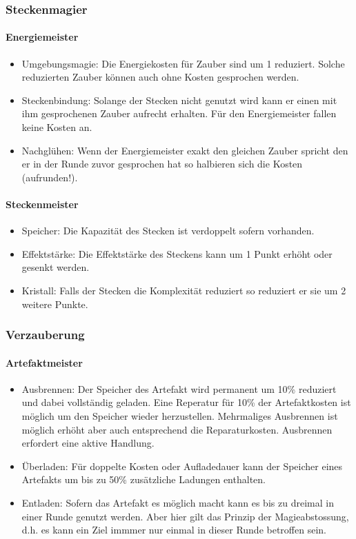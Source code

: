 \documentclass{article}
\begin{document}
\subsubsection{Steckenmagier}

\paragraph{Energiemeister}

\begin{itemize}
\item Umgebungsmagie: Die Energiekosten für Zauber sind um 1 reduziert. Solche reduzierten Zauber können auch ohne Kosten gesprochen werden.
\item Steckenbindung: Solange der Stecken nicht genutzt wird kann er einen mit ihm gesprochenen Zauber aufrecht erhalten. Für den Energiemeister fallen keine Kosten an.
\item Nachglühen: Wenn der Energiemeister exakt den gleichen Zauber spricht den er in der Runde zuvor gesprochen hat so halbieren sich die Kosten (aufrunden!).
\end{itemize}

\paragraph{Steckenmeister}

\begin{itemize}
\item Speicher: Die Kapazität des Stecken ist verdoppelt sofern vorhanden.
\item Effektstärke: Die Effektstärke des Steckens kann um 1 Punkt erhöht oder gesenkt werden.
\item Kristall: Falls der Stecken die Komplexität reduziert so reduziert er sie um 2 weitere Punkte.
\end{itemize}

\subsubsection{Verzauberung}

\paragraph{Artefaktmeister}

\begin{itemize}
\item Ausbrennen: Der Speicher des Artefakt wird permanent um 10\% reduziert und dabei vollständig geladen. Eine Reperatur für 10\% der Artefaktkosten ist möglich um den Speicher wieder herzustellen. Mehrmaliges Ausbrennen ist möglich erhöht aber auch entsprechend die Reparaturkosten. Ausbrennen erfordert eine aktive Handlung.
\item Überladen: Für doppelte Kosten oder Aufladedauer kann der Speicher eines Artefakts um bis zu 50\% zusätzliche Ladungen enthalten.
\item Entladen: Sofern das Artefakt es möglich macht kann es bis zu dreimal in einer Runde genutzt werden. Aber hier gilt das Prinzip der Magieabstossung, d.h. es kann ein Ziel immmer nur einmal in dieser Runde betroffen sein.
\end{itemize}
\end{document}
